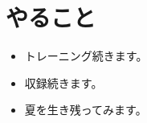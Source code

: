 \documentclass[a4paper, 12pt]{article}
\begin{document}


\section*{やること}
\begin{itemize}
    \item トレーニング続きます。
    \item 収録続きます。
    \item 夏を生き残ってみます。
\end{itemize}



\end{document}
